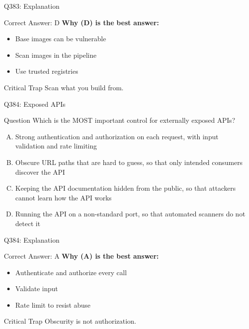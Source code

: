 \documentclass{beamer}
\begin{document}
	\begin{frame}{Q383: Explanation}
		\begin{block}{Correct Answer: D}
			\textbf{Why (D) is the best answer:}
			\begin{itemize}
				\item Base images can be vulnerable
				\item Scan images in the pipeline
				\item Use trusted registries
			\end{itemize}
		\end{block}
		\begin{alertblock}{Critical Trap}
			Scan what you build from.
		\end{alertblock}
	\end{frame}
	
	\begin{frame}{Q384: Exposed APIs}
		\begin{block}{Question}
			\small Which is the MOST important control for externally exposed APIs?
		\end{block}
		\begin{enumerate}[(A)]
			\footnotesize
			\item Strong authentication and authorization on each request, with input validation and rate limiting
			\item Obscure URL paths that are hard to guess, so that only intended consumers discover the API
			\item Keeping the API documentation hidden from the public, so that attackers cannot learn how the API works
			\item Running the API on a non-standard port, so that automated scanners do not detect it
		\end{enumerate}
	\end{frame}
	
	\begin{frame}{Q384: Explanation}
		\begin{block}{Correct Answer: A}
			\textbf{Why (A) is the best answer:}
			\begin{itemize}
				\item Authenticate and authorize every call
				\item Validate input
				\item Rate limit to resist abuse
			\end{itemize}
		\end{block}
		\begin{alertblock}{Critical Trap}
			Obscurity is not authorization.
		\end{alertblock}
	\end{frame}
	
\end{document}
